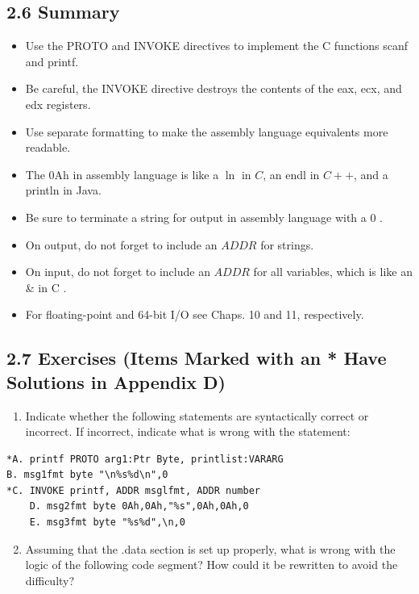 \documentclass[10pt]{article}
\begin{document}
\subsection*{2.6 Summary}
\begin{itemize}
  \item Use the PROTO and INVOKE directives to implement the C functions scanf and printf.
  \item Be careful, the INVOKE directive destroys the contents of the eax, ecx, and edx registers.
  \item Use separate formatting to make the assembly language equivalents more readable.
  \item The 0Ah in assembly language is like a $\ln$ in $C$, an endl in $C++$, and a println in Java.
  \item Be sure to terminate a string for output in assembly language with a 0 .
  \item On output, do not forget to include an $A D D R$ for strings.
  \item On input, do not forget to include an $A D D R$ for all variables, which is like an \& in C .
  \item For floating-point and 64-bit I/O see Chaps. 10 and 11, respectively.
\end{itemize}

\subsection*{2.7 Exercises (Items Marked with an * Have Solutions in Appendix D)}
\begin{enumerate}
  \item Indicate whether the following statements are syntactically correct or incorrect. If incorrect, indicate what is wrong with the statement:
\end{enumerate}

\begin{verbatim}
*A. printf PROTO arg1:Ptr Byte, printlist:VARARG
B. msg1fmt byte "\n%s%d\n",0
*C. INVOKE printf, ADDR msglfmt, ADDR number
    D. msg2fmt byte 0Ah,0Ah,"%s",0Ah,0Ah,0
    E. msg3fmt byte "%s%d",\n,0
\end{verbatim}

\begin{enumerate}
  \setcounter{enumi}{1}
  \item Assuming that the .data section is set up properly, what is wrong with the logic of the following code segment? How could it be rewritten to avoid the difficulty?
\end{enumerate}
\end{document}
